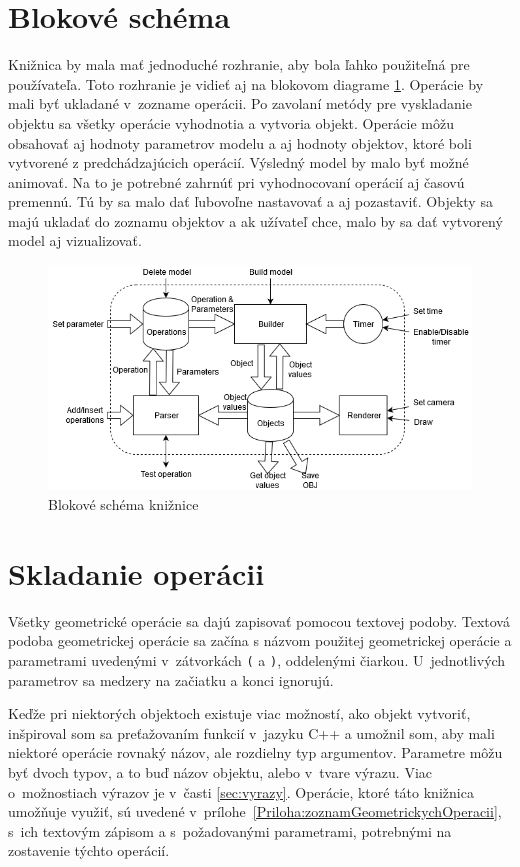 \section{Blokové schéma}

Knižnica by mala mať jednoduché rozhranie, aby bola ľahko použiteľná pre používateľa. Toto rozhranie je vidieť aj na blokovom diagrame \ref{fig:blockDiagram}. Operácie by mali byť ukladané v~zozname operácii. Po zavolaní metódy pre vyskladanie objektu sa všetky operácie vyhodnotia a vytvoria objekt. Operácie môžu obsahovať aj hodnoty parametrov modelu a aj hodnoty objektov, ktoré boli vytvorené z predchádzajúcich operácií. Výsledný model by malo byť možné animovať. Na to je potrebné zahrnúť pri vyhodnocovaní operácií aj časovú premennú. Tú by sa malo dať ľubovoľne nastavovať a aj pozastaviť. Objekty sa majú ukladať do zoznamu objektov a ak užívateľ chce, malo by sa dať vytvorený model aj vizualizovať. 

\begin{figure}[H]
	\centering
	\includegraphics[width=1\textwidth]{obrazky-figures/Diagram.png}
	\caption{Blokové schéma knižnice }
	\label{fig:blockDiagram}
\end{figure}

\section{Skladanie operácii }
\label{sec:skladanie}
Všetky geometrické operácie sa dajú zapisovať pomocou textovej podoby. 
Textová podoba geometrickej operácie sa začína s názvom použitej geometrickej operácie a parametrami uvedenými v~zátvorkách \texttt{(} a \texttt{)}, oddelenými čiarkou. U~jednotlivých parametrov sa medzery na začiatku a konci ignorujú.

 Keďže pri niektorých objektoch existuje viac možností, ako objekt vytvoriť, inšpiroval som sa preťažovaním funkcií v~jazyku C++ a umožnil som, aby mali niektoré operácie rovnaký názov, ale rozdielny typ argumentov. Parametre môžu byť dvoch typov, a to buď názov objektu, alebo v~tvare výrazu. Viac o~možnostiach výrazov je v~časti \ref{sec:vyrazy}. Operácie, ktoré táto knižnica umožňuje využiť, sú uvedené v~prílohe~\ref{Priloha:zoznamGeometrickychOperacii}, s~ich textovým zápisom a s~požadovanými parametrami, potrebnými na zostavenie týchto operácií.

